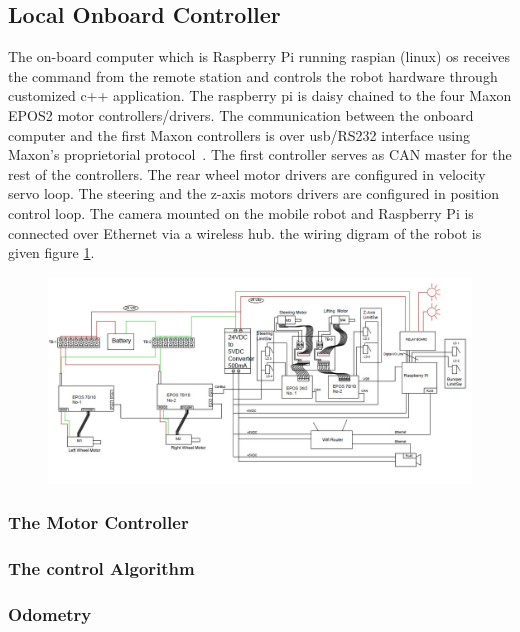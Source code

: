 \subsection{Local Onboard Controller}
The  on-board computer which is Raspberry Pi running raspian (linux) os receives the command from the remote station and controls the robot hardware through customized c++ application.
The raspberry pi  is daisy chained to the four Maxon EPOS2 motor controllers/drivers. The communication between the onboard computer and the first Maxon controllers is over usb/RS232 interface using Maxon's proprietorial protocol~\cite{maxonrs232}. The first controller serves as CAN master for the rest of the controllers. The rear wheel motor drivers are configured in velocity servo loop. The steering and the z-axis motors drivers are configured in position control loop.  The camera mounted on the mobile robot  and Raspberry Pi  is connected over Ethernet via a wireless hub. the wiring digram of the robot is given figure \ref {fig:wiring}.
\begin{figure}
	\includegraphics[width=\linewidth,keepaspectratio]{Chapter5/fig/RobotSideWiring}
	\label{fig:wiring} 
\end{figure} 
\subsubsection{The Motor Controller}

\subsubsection{The control Algorithm}
\subsubsection{Odometry }



